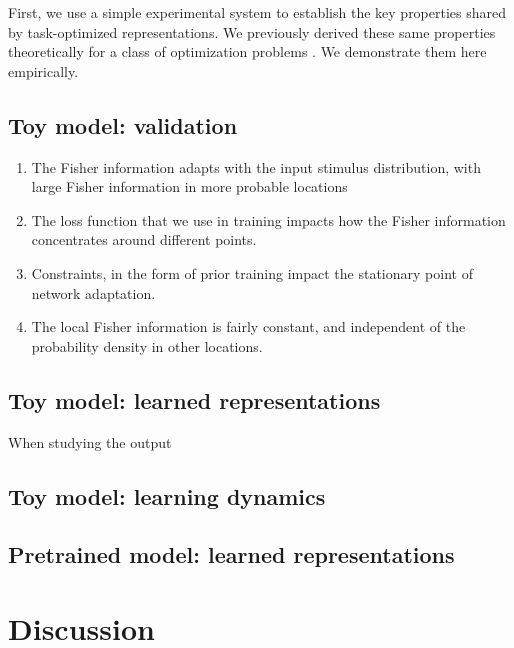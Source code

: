 \documentclass[10pt, twocolumn]{article}      %
\begin{document}
First, we use a simple experimental system to establish the key properties shared by task-optimized representations.
We previously derived these same properties theoretically for a class of optimization problems \cite{rast_adaptation_2020}.
We demonstrate them here empirically. 



\subsection{Toy model: validation}




\begin{enumerate}
  \item The Fisher information adapts with the input stimulus distribution, with large Fisher information in more probable locations
  \item The loss function that we use in training impacts how the Fisher information concentrates around different points.
  \item Constraints, in the form of prior training impact the stationary point of network adaptation.
  \item The local Fisher information is fairly constant, and independent of the probability density in other locations.
\end{enumerate}




\subsection{Toy model: learned representations}

When studying the output 






\subsection{Toy model: learning dynamics}


\subsection{Pretrained model: learned representations}



\section{Discussion}
\end{document}
